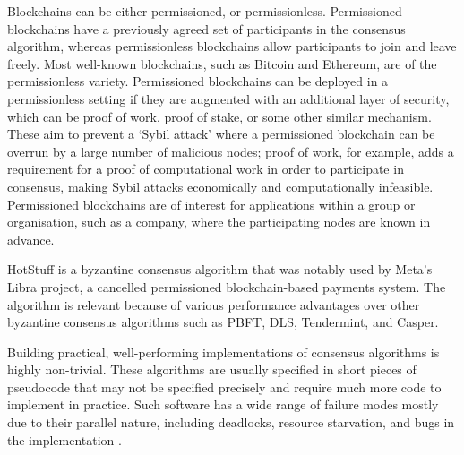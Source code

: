Blockchains can be either permissioned, or permissionless. Permissioned blockchains have a previously agreed set of participants in the consensus algorithm, whereas permissionless blockchains allow participants to join and leave freely. Most well-known blockchains, such as Bitcoin and Ethereum, are of the permissionless variety. Permissioned blockchains can be deployed in a permissionless setting if they are augmented with an additional layer of security, which can be proof of work, proof of stake, or some other similar mechanism. These aim to prevent a `Sybil attack' where a permissioned blockchain can be overrun by a large number of malicious nodes; proof of work, for example, adds a requirement for a proof of computational work in order to participate in consensus, making Sybil attacks economically and computationally infeasible. Permissioned blockchains are of interest for applications within a group or organisation, such as a company, where the participating nodes are known in advance.

HotStuff is a byzantine consensus algorithm that was notably used by Meta's Libra project, a cancelled permissioned blockchain-based payments system. The algorithm is relevant because of various performance advantages over other byzantine consensus algorithms such as PBFT, DLS, Tendermint, and Casper.


Building practical, well-performing implementations of consensus algorithms is highly non-trivial. These algorithms are usually specified in short pieces of pseudocode that may not be specified precisely and require much more code to implement in practice. Such software has a wide range of failure modes mostly due to their parallel nature, including deadlocks, resource starvation, and bugs in the implementation \cite{chubby}.

